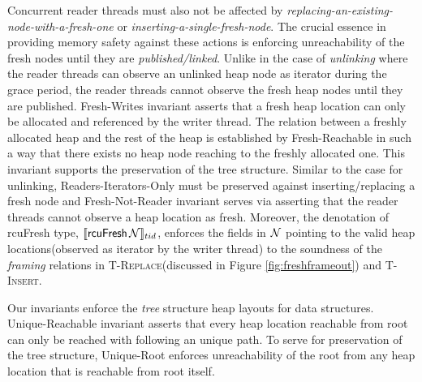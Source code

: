  Concurrent reader threads must also not be affected by \textit{replacing-an-existing-node-with-a-fresh-one} or \textit{inserting-a-single-fresh-node}. The crucial essence in providing memory safety against these actions is enforcing unreachability of the fresh nodes until they are \textit{published/linked}. Unlike in the case of \textit{unlinking} where the reader threads can observe an unlinked heap node as \textsf{iterator} during the grace period, the reader threads cannot observe the fresh heap nodes until they are published. \textsf{Fresh-Writes} invariant asserts that a fresh heap location can only be allocated and referenced by the writer thread. The relation between a freshly allocated heap and the rest of the heap is established by \textsf{Fresh-Reachable} in such a way that there exists no heap node reaching to the freshly allocated one. This invariant supports the preservation of the tree structure. Similar to the case for unlinking, \textsf{Readers-Iterators-Only} must be preserved against inserting/replacing a fresh node and \textsf{Fresh-Not-Reader} invariant serves via asserting that the reader threads cannot observe a heap location as \textsf{fresh}. Moreover, the denotation of \textsf{rcuFresh} type, $\llbracket \mathsf{rcuFresh}\,\mathcal{N} \rrbracket_{tid}$, enforces the fields in $\mathcal{N}$ pointing to the valid heap locations(observed as \textsf{iterator} by the writer thread) to  the soundness of the \textit{framing} relations in \textsc{T-Replace}(discussed in Figure \ref{fig:freshframeout}) and \textsc{T-Insert}.

 Our invariants enforce the \textit{tree} structure heap layouts for data structures. \textsf{Unique-Reachable} invariant asserts that every heap location reachable from root can only be reached with following an unique path. To serve for preservation of the tree structure, \textsf{Unique-Root} enforces unreachability of the root from any heap location that is reachable from root itself. 
